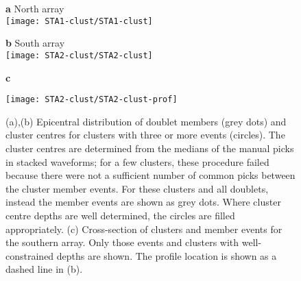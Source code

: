 \documentclass[reviewcopy]{elsarticle}
\renewcommand{\includegraphics}[2][]{\fbox{#2}}
\begin{document}
\begin{figure}
\parbox{0.5\textwidth}{{\sf \bf a} North array \\
\texttt{[image: STA1-clust/STA1-clust]}}
\parbox{0.5\textwidth}{{\sf \bf b} South array \\
\texttt{[image: STA2-clust/STA2-clust]}}

\vspace{\baselineskip}
{\sf \bf c}

\texttt{[image: STA2-clust/STA2-clust-prof]}

\caption{(a),(b) Epicentral distribution of doublet members (grey
  dots) and cluster centres
  for clusters with three or more events (circles). The cluster centres
  are determined from the medians of the manual picks in stacked
  waveforms; for a few clusters, these procedure failed because there
  were not a sufficient number of common picks between the cluster
  member events.   For these clusters and all doublets, instead the
  member events are shown as grey dots.  Where cluster centre
  depths are well determined, the circles are filled appropriately.
 (c) Cross-section of clusters and member events for the southern array. Only those events and
 clusters with well-constrained depths are shown. The profile location
is shown as a dashed line in (b).}
\label{fig:clust-location}
\end{figure}
\end{document}
